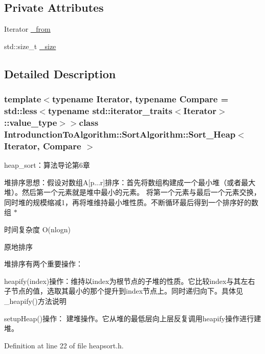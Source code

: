 \subsection*{Private Attributes}
\begin{DoxyCompactItemize}
\item 
Iterator \hyperlink{class_introdunction_to_algorithm_1_1_sort_algorithm_1_1_sort___heap_a7f6c20382257308edd2c0049ec46ad66}{\+\_\+from}
\item 
std\+::size\+\_\+t \hyperlink{class_introdunction_to_algorithm_1_1_sort_algorithm_1_1_sort___heap_a3cbf6e8a1972cc62bce0b50226024a52}{\+\_\+size}
\end{DoxyCompactItemize}


\subsection{Detailed Description}
\subsubsection*{template$<$typename Iterator, typename Compare = std\+::less$<$typename std\+::iterator\+\_\+traits$<$\+Iterator$>$\+::value\+\_\+type$>$$>$class Introdunction\+To\+Algorithm\+::\+Sort\+Algorithm\+::\+Sort\+\_\+\+Heap$<$ Iterator, Compare $>$}

heap\+\_\+sort：算法导论第6章 


\begin{DoxyItemize}
\item 堆排序思想：假设对数组\+A\mbox{[}p...r\mbox{]}排序：首先将数组构建成一个最小堆（或者最大堆）。然后第一个元素就是堆中最小的元素。 将第一个元素与最后一个元素交换，同时堆的规模缩减1，再将堆维持最小堆性质。不断循环最后得到一个排序好的数组 $\ast$
\item 时间复杂度 O(nlogn)
\item 原地排序
\end{DoxyItemize}

堆排序有两个重要操作：


\begin{DoxyItemize}
\item heapify(index)操作：维持以index为根节点的子堆的性质。它比较index与其左右子节点的值，选取其最小的那个提升到index节点上。同时递归向下。具体见\+\_\+heapify()方法说明
\item setup\+Heap()操作： 建堆操作。它从堆的最低层向上层反复调用heapify操作进行建堆。 
\end{DoxyItemize}

Definition at line 22 of file heapsort.\+h.



